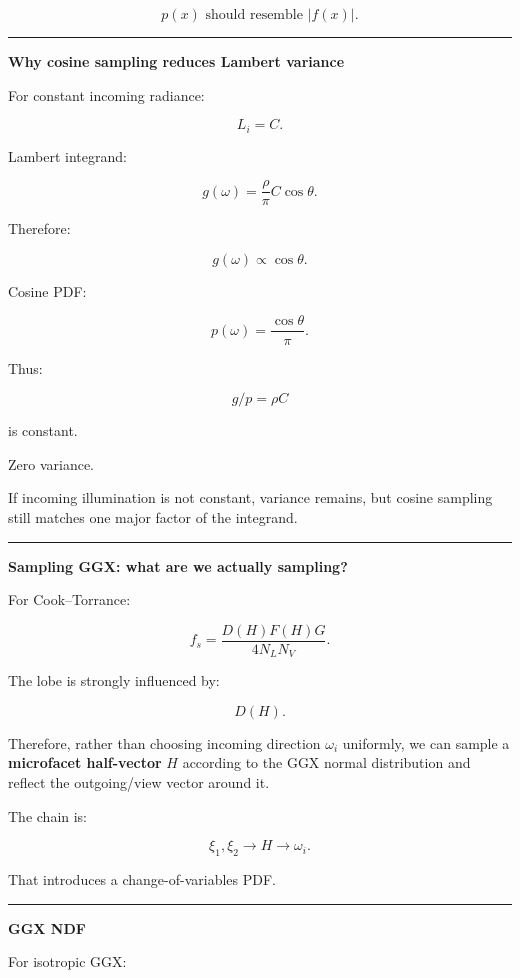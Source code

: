 \[
\boxed{
p(x)\text{ should resemble }|f(x)|.
}
\]

\begin{center}\rule{0.5\linewidth}{0.5pt}\end{center}

\textbf{Why cosine sampling reduces Lambert variance}

For constant incoming radiance:

\[
L_i=C.
\]

Lambert integrand:

\[
g(\omega)
=
\frac{\rho}{\pi}
C
\cos\theta.
\]

Therefore:

\[
g(\omega)\propto\cos\theta.
\]

Cosine PDF:

\[
p(\omega)
=
\frac{\cos\theta}{\pi}.
\]

Thus:

\[
g/p
=
\rho C
\]

is constant.

Zero variance.

If incoming illumination is not constant, variance remains, but cosine sampling still matches one major factor of the integrand.

\begin{center}\rule{0.5\linewidth}{0.5pt}\end{center}

\textbf{Sampling GGX: what are we actually sampling?}

For Cook--Torrance:

\[
f_s=
\frac{D(H)F(H)G}{4N_LN_V}.
\]

The lobe is strongly influenced by:

\[
D(H).
\]

Therefore, rather than choosing incoming direction \(\omega_i\) uniformly, we can sample a \textbf{microfacet half-vector} \(H\) according to the GGX normal distribution and reflect the outgoing/view vector around it.

The chain is:

\[
\xi_1,\xi_2
\rightarrow
H
\rightarrow
\omega_i.
\]

That introduces a change-of-variables PDF.

\begin{center}\rule{0.5\linewidth}{0.5pt}\end{center}

\textbf{GGX NDF}

For isotropic GGX:

